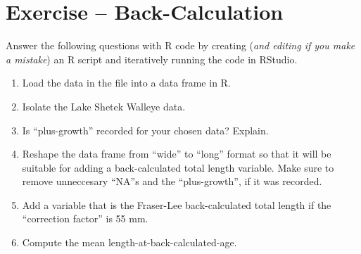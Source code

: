 \documentclass{article}\usepackage[]{graphicx}\usepackage[]{color}
\newif\ifmakekey
\begin{document}

\section*{Exercise -- Back-Calculation}
Answer the following questions with R code by creating (\textit{and editing if you make a mistake}) an R script and iteratively running the code in RStudio.

\begin{enumerate}
  \item Load the data in the  file into a data frame in R.


  \item Isolate the Lake Shetek Walleye data.


  \item Is ``plus-growth'' recorded for your chosen data?  Explain.


\ifmakekey
``Plus-growth'' is recorded because one more ``anu'' measurement appears in the data file then the assessed age.  For example, fish 155 was 1-year-old but two radial measurements were recorded and fish 1215 was 6-years-old but seven radial measurements were recorded.
\fi
  \item Reshape the data frame from ``wide'' to ``long'' format so that it will be suitable for adding a back-calculated total length variable.  Make sure to remove unneccesary ``NA''s and the ``plus-growth'', if it was recorded.


  \item Add a variable that is the Fraser-Lee back-calculated total length if the ``correction factor'' is 55 mm.


  \item Compute the mean length-at-back-calculated-age.


\end{enumerate}
\end{document}
